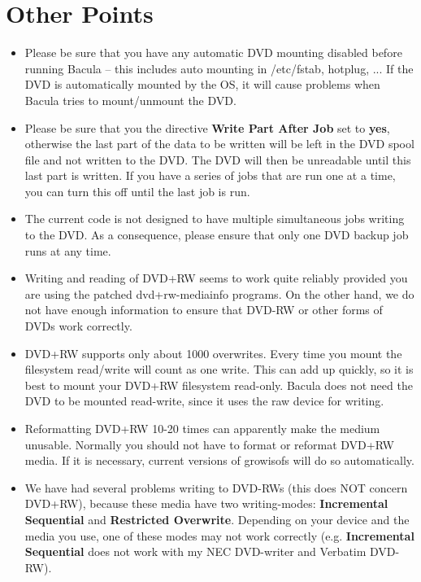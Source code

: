\label{DVDpoints}
\section{Other Points}

\begin{itemize}
\item Please be sure that you have any automatic DVD mounting
   disabled before running Bacula -- this includes auto mounting
   in /etc/fstab, hotplug, ...  If the DVD is automatically
   mounted by the OS, it will cause problems when Bacula tries
   to mount/unmount the DVD.
\item Please be sure that you the directive {\bf Write Part After Job}
   set to {\bf yes}, otherwise the last part of the data to be
   written will be left in the DVD spool file and not written to
   the DVD. The DVD will then be unreadable until this last part
   is written.  If you have a series of jobs that are run one at
   a time, you can turn this off until the last job is run.
\item The current code is not designed to have multiple simultaneous
   jobs writing to the DVD.  As a consequence, please ensure that
   only one DVD backup job runs at any time.
\item Writing and reading of DVD+RW seems to work quite reliably
   provided you are using the patched dvd+rw-mediainfo programs.
   On the other hand, we do not have enough information to ensure
   that DVD-RW or other forms of DVDs work correctly.
\item DVD+RW supports only about 1000 overwrites. Every time you
   mount the filesystem read/write will count as one write. This can
   add up quickly, so it is best to mount your DVD+RW filesystem read-only.
   Bacula does not need the DVD to be mounted read-write, since it uses
   the raw device for writing.
\item Reformatting DVD+RW 10-20 times can apparently make the medium 
   unusable. Normally you should not have to format or reformat
   DVD+RW media. If it is necessary, current versions of growisofs will
   do so automatically.
\item We have had several problems writing to DVD-RWs (this does NOT
  concern DVD+RW), because these media have two writing-modes: {\bf
  Incremental Sequential} and {\bf Restricted Overwrite}.  Depending on
  your device and the media you use, one of these modes may not work
  correctly (e.g.  {\bf Incremental Sequential} does not work with my NEC
  DVD-writer and Verbatim DVD-RW).


\end{itemize}
